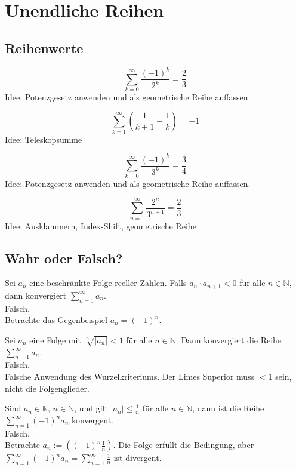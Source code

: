 \section{Unendliche Reihen}
\subsection{Reihenwerte}
\begin{displaymath}
  \sum_{k = 0}^{\infty} \frac{(-1)^k}{2^k} = \frac{2}{3}
\end{displaymath}
Idee: Potenzgesetz anwenden und als geometrische Reihe auffassen.

\begin{displaymath}
  \sum_{k = 1}^{\infty} \left(\frac{1}{k+1}-\frac{1}{k}\right) = -1
\end{displaymath}
Idee: Teleskopsumme

\begin{displaymath}
  \sum_{k = 0}^{\infty} \frac{(-1)^k}{3^k} = \frac{3}{4}
\end{displaymath}
Idee: Potenzgesetz anwenden und als geometrische Reihe auffassen.

\begin{displaymath}
  \sum_{n = 1}^{\infty} \frac{2^n}{3^{n+1}} = \frac{2}{3}
\end{displaymath}
Idee: Ausklammern, Index-Shift, geometrische Reihe

\subsection{Wahr oder Falsch?}
Sei $a_n$ eine beschränkte Folge reeller Zahlen.
Falls $a_n \cdot a_{n+1} < 0$ für alle $n \in \mathbb{N}$, dann konvergiert $\sum\limits_{n = 1}^{\infty} a_n$.\\
Falsch.\\
Betrachte das Gegenbeispiel $a_n = (-1)^n$.

Sei $a_n$ eine Folge mit $\sqrt[n]{|a_n|} < 1$ für alle $n \in \mathbb{N}$. Dann konvergiert die Reihe $\sum\limits_{n = 1}^{\infty} a_n$.\\
Falsch.\\
Falsche Anwendung des Wurzelkriteriums. Der Limes Superior muss $< 1$ sein, nicht die Folgenglieder.

Sind $a_n \in \mathbb{R}$, $n \in \mathbb{N}$, und gilt $|a_n| \leq \frac{1}{n}$ für alle $n \in \mathbb{N}$, dann ist die Reihe $\sum_{n = 1}^{\infty} (-1)^n a_n$ konvergent.\\
Falsch.\\
Betrachte $a_n := \left((-1)^n \frac{1}{n}\right)$. Die Folge erfüllt die Bedingung, aber $\sum_{n = 1}^{\infty} (-1)^n a_n = \sum_{n = 1}^{\infty} \frac{1}{n}$ ist divergent.

